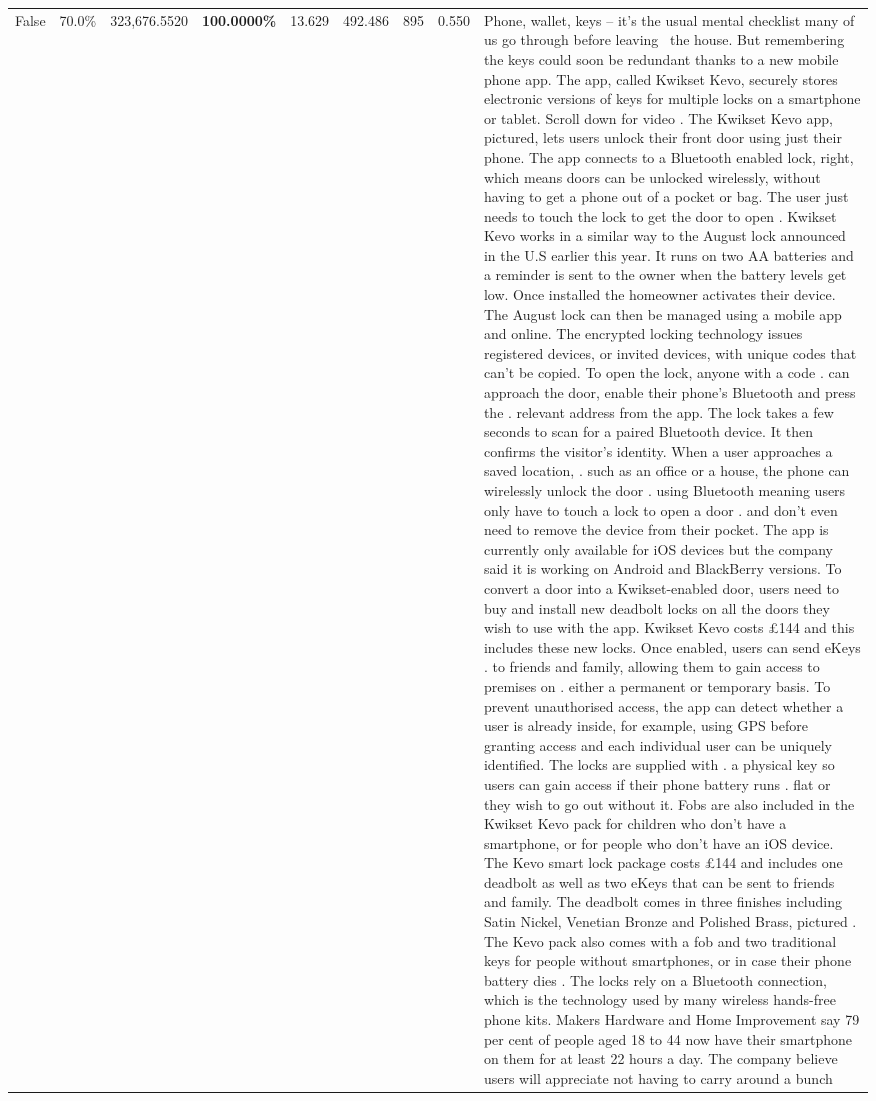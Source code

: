 \begin{table}[H]
\begin{tabular}{lllrlllll}
False & 70.0\% & 323,676.5520 & \bfseries \color{red} 100.0000\% & 13.629 & 492.486 & 895 & 0.550 & Phone, wallet, keys – it’s the usual mental checklist many of us go through before leaving  the house. But remembering the keys could soon be redundant thanks to a new mobile phone app. The app, called Kwikset Kevo, securely stores electronic versions of keys for multiple locks on a smartphone or tablet. Scroll down for video . The Kwikset Kevo app, pictured, lets users unlock their front door using just their phone. The app connects to a Bluetooth enabled lock, right, which means doors can be unlocked wirelessly, without having to get a phone out of a pocket or bag. The user just needs to touch the lock to get the door to open . Kwikset Kevo works in a similar way to the August lock announced in the U.S earlier this year. It runs on two AA batteries and a reminder is sent to the owner when the battery levels get low. Once installed the homeowner activates their device. The August lock can then be managed using a mobile app and online. The encrypted locking technology issues registered devices, or invited devices, with unique codes that can't be copied. To open the lock, anyone with a code . can approach the door, enable their phone's Bluetooth and press the . relevant address from the app. The lock takes a few seconds to scan for a paired Bluetooth device. It then confirms the visitor's identity. When a user approaches a saved location, . such as an office or a house, the phone can wirelessly unlock the door . using Bluetooth meaning users only have to touch a lock to open a door . and don't even need to remove the device from their pocket. The app is currently only available for iOS devices but the company said it is working on Android and BlackBerry versions. To convert a door into a Kwikset-enabled door, users need to buy and install new deadbolt locks on all the doors they wish to use with the app. Kwikset Kevo costs £144 and this includes these new locks. Once enabled, users can send eKeys . to friends and family, allowing them to gain access to premises on . either a permanent or temporary basis. To prevent unauthorised access, the app can detect whether a user is already inside, for example, using GPS before granting access and each individual user can be uniquely identified. The locks are supplied with . a physical key so users can gain access if their phone battery runs . flat or they wish to go out without it. Fobs are also included in the Kwikset Kevo pack for children who don't have a smartphone, or for people who don't have an iOS device. The Kevo smart lock package costs £144 and includes one deadbolt as well as two eKeys that can be sent to friends and family. The deadbolt comes in three finishes including Satin Nickel, Venetian Bronze and Polished Brass, pictured . The Kevo pack also comes with a fob and two traditional keys for people without smartphones, or in case their phone battery dies . The locks rely on a Bluetooth connection, which is the technology used by many wireless hands-free phone kits. Makers Hardware and Home Improvement say 79 per cent of people aged 18 to 44 now have their smartphone on them for at least 22 hours a day. The company believe users will appreciate not having to carry around a bunch 
\end{tabular}
\end{table}
